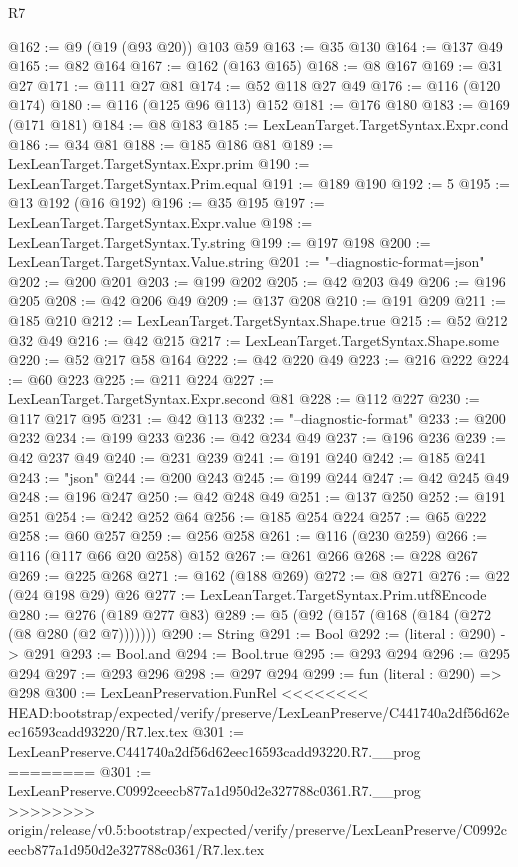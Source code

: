 \begin{lexlean}{R7}
\begin{coremodule}
{{{{{{{{{{{{{@162 := @9 (@19 (@93 @20)) @103 @59
@163 := @35 @130
@164 := @137 @49
@165 := @82 @164
@167 := @162 (@163 @165)
@168 := @8 @167
@169 := @31 @27
@171 := @111 @27 @81
@174 := @52 @118 @27 @49
@176 := @116 (@120 @174)
@180 := @116 (@125 @96 @113) @152
@181 := @176 @180
@183 := @169 (@171 @181)
@184 := @8 @183
@185 := LexLeanTarget.TargetSyntax.Expr.cond
@186 := @34 @81
@188 := @185 @186 @81
@189 := LexLeanTarget.TargetSyntax.Expr.prim
@190 := LexLeanTarget.TargetSyntax.Prim.equal
@191 := @189 @190
@192 := 5
@195 := @13 @192 (@16 @192)
@196 := @35 @195
@197 := LexLeanTarget.TargetSyntax.Expr.value
@198 := LexLeanTarget.TargetSyntax.Ty.string
@199 := @197 @198
@200 := LexLeanTarget.TargetSyntax.Value.string
@201 := "--diagnostic-format=json"
@202 := @200 @201
@203 := @199 @202
@205 := @42 @203 @49
@206 := @196 @205
@208 := @42 @206 @49
@209 := @137 @208
@210 := @191 @209
@211 := @185 @210
@212 := LexLeanTarget.TargetSyntax.Shape.true
@215 := @52 @212 @32 @49
@216 := @42 @215
@217 := LexLeanTarget.TargetSyntax.Shape.some
@220 := @52 @217 @58 @164
@222 := @42 @220 @49
@223 := @216 @222
@224 := @60 @223
@225 := @211 @224
@227 := LexLeanTarget.TargetSyntax.Expr.second @81
@228 := @112 @227
@230 := @117 @217 @95
@231 := @42 @113
@232 := "--diagnostic-format"
@233 := @200 @232
@234 := @199 @233
@236 := @42 @234 @49
@237 := @196 @236
@239 := @42 @237 @49
@240 := @231 @239
@241 := @191 @240
@242 := @185 @241
@243 := "json"
@244 := @200 @243
@245 := @199 @244
@247 := @42 @245 @49
@248 := @196 @247
@250 := @42 @248 @49
@251 := @137 @250
@252 := @191 @251
@254 := @242 @252 @64
@256 := @185 @254 @224
@257 := @65 @222
@258 := @60 @257
@259 := @256 @258
@261 := @116 (@230 @259)
@266 := @116 (@117 @66 @20 @258) @152
@267 := @261 @266
@268 := @228 @267
@269 := @225 @268
@271 := @162 (@188 @269)
@272 := @8 @271
@276 := @22 (@24 @198 @29) @26
@277 := LexLeanTarget.TargetSyntax.Prim.utf8Encode
@280 := @276 (@189 @277 @83)
@289 := @5 (@92 (@157 (@168 (@184 (@272 (@8 @280 (@2 @7)))))))
@290 := String
@291 := Bool
@292 := (literal : @290) -> @291
@293 := Bool.and
@294 := Bool.true
@295 := @293 @294
@296 := @295 @294
@297 := @293 @296
@298 := @297 @294
@299 := fun (literal : @290) => @298
@300 := LexLeanPreservation.FunRel
<<<<<<<< HEAD:bootstrap/expected/verify/preserve/LexLeanPreserve/C441740a2df56d62eec16593cadd93220/R7.lex.tex
@301 := LexLeanPreserve.C441740a2df56d62eec16593cadd93220.R7.__prog
========
@301 := LexLeanPreserve.C0992ceecb877a1d950d2e327788c0361.R7.__prog
>>>>>>>> origin/release/v0.5:bootstrap/expected/verify/preserve/LexLeanPreserve/C0992ceecb877a1d950d2e327788c0361/R7.lex.tex
}}}}}}}}}}}}}
\end{coremodule}
\end{lexlean}
